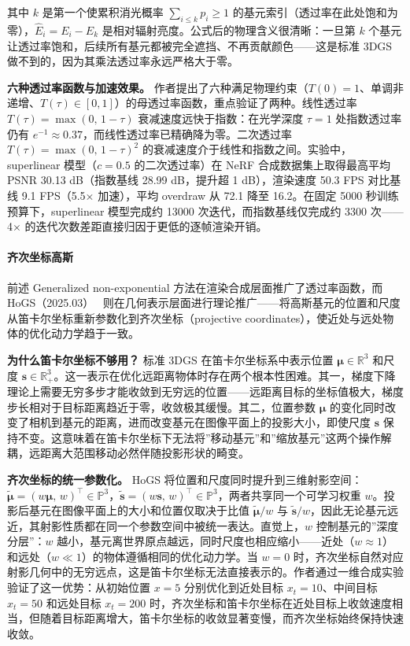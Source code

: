 其中 $k$ 是第一个使累积消光概率 $\sum_{i \leq k} p_i \geq 1$ 的基元索引（透过率在此处饱和为零），$\hat{E}_i = E_i - E_k$ 是相对辐射亮度。公式后的物理含义很清晰：一旦第 $k$ 个基元让透过率饱和，后续所有基元都被完全遮挡、不再贡献颜色——这是标准 3DGS 做不到的，因为其乘法透过率永远严格大于零。

\textbf{六种透过率函数与加速效果。}
作者提出了六种满足物理约束（$T(0)=1$、单调非递增、$T(\tau) \in [0,1]$）的母透过率函数，重点验证了两种。线性透过率 $T(\tau) = \max(0,\, 1 - \tau)$ 衰减速度远快于指数：在光学深度 $\tau = 1$ 处指数透过率仍有 $e^{-1} \approx 0.37$，而线性透过率已精确降为零。二次透过率 $T(\tau) = \max(0,\, 1 - \tau)^2$ 的衰减速度介于线性和指数之间。实验中，superlinear 模型（$c = 0.5$ 的二次透过率）在 NeRF 合成数据集上取得最高平均 PSNR 30.13 dB（指数基线 28.99 dB，提升超 1 dB），渲染速度 50.3 FPS 对比基线 9.1 FPS（5.5$\times$ 加速），平均 overdraw 从 72.1 降至 16.2。在固定 5000 秒训练预算下，superlinear 模型完成约 13000 次迭代，而指数基线仅完成约 3300 次——4$\times$ 的迭代次数差距直接归因于更低的逐帧渲染开销。

\paragraph{齐次坐标高斯}

前述 Generalized non-exponential 方法在渲染合成层面推广了透过率函数，而 HoGS（2025.03）~\cite{2503_19232} 则在几何表示层面进行理论推广——将高斯基元的位置和尺度从笛卡尔坐标重新参数化到齐次坐标（projective coordinates），使近处与远处物体的优化动力学趋于一致。

\textbf{为什么笛卡尔坐标不够用？}
标准 3DGS 在笛卡尔坐标系中表示位置 $\boldsymbol{\mu} \in \mathbb{R}^3$ 和尺度 $\mathbf{s} \in \mathbb{R}^3_+$。这一表示在优化远距离物体时存在两个根本性困难。其一，梯度下降理论上需要无穷多步才能收敛到无穷远的位置——远距离目标的坐标值极大，梯度步长相对于目标距离趋近于零，收敛极其缓慢。其二，位置参数 $\boldsymbol{\mu}$ 的变化同时改变了相机到基元的距离，进而改变基元在图像平面上的投影大小，即使尺度 $\mathbf{s}$ 保持不变。这意味着在笛卡尔坐标下无法将”移动基元”和”缩放基元”这两个操作解耦，远距离大范围移动必然伴随投影形状的畸变。

\textbf{齐次坐标的统一参数化。}
HoGS 将位置和尺度同时提升到三维射影空间：$\tilde{\boldsymbol{\mu}} = (w\boldsymbol{\mu},\, w)^\top \in \mathbb{P}^3$，$\tilde{\mathbf{s}} = (w\mathbf{s},\, w)^\top \in \mathbb{P}^3$，两者共享同一个可学习权重 $w$。投影后基元在图像平面上的大小和位置仅取决于比值 $\tilde{\boldsymbol{\mu}}/w$ 与 $\tilde{\mathbf{s}}/w$，因此无论基元远近，其射影性质都在同一个参数空间中被统一表达。直觉上，$w$ 控制基元的”深度分层”：$w$ 越小，基元离世界原点越远，同时尺度也相应缩小——近处（$w \approx 1$）和远处（$w \ll 1$）的物体遵循相同的优化动力学。当 $w = 0$ 时，齐次坐标自然对应射影几何中的无穷远点，这是笛卡尔坐标无法直接表示的。作者通过一维合成实验验证了这一优势：从初始位置 $x=5$ 分别优化到近处目标 $x_t=10$、中间目标 $x_t=50$ 和远处目标 $x_t=200$ 时，齐次坐标和笛卡尔坐标在近处目标上收敛速度相当，但随着目标距离增大，笛卡尔坐标的收敛显著变慢，而齐次坐标始终保持快速收敛。

